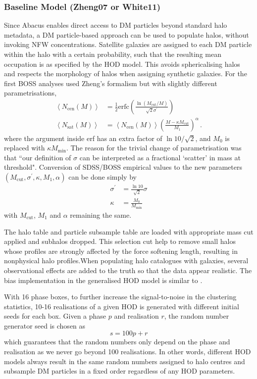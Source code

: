 \documentclass[10pt,A4]{aastex62}
\begin{document}
		\subsubsection{Baseline Model (Zheng07 or White11)}
			
			Since Abacus enables direct access to DM particles beyond standard halo metadata, a DM particle-based approach can be used to populate halos, without invoking NFW concentrations. Satellite galaxies are assigned to each DM particle within the halo with a certain probability, such that the resulting mean occupation is as specified by the HOD model. This avoids sphericalising halos and respects the morphology of halos when assigning synthetic galaxies. For the first BOSS analyses \cite{white11} used Zheng's formalism but with slightly different parametrisations,
			\begin{align}
				\left< N_\text{cen} (M) \right> &= \frac{1}{2} \mathrm{erfc} \left( \frac{\ln(M_\text{cut} / M)}{\sqrt{2} \sigma^\prime} \right) \\
				\left< N_\text{sat} (M) \right> &= \left< N_\text{cen} (M) \right> \left( \frac{M - \kappa M _\text{cut} }{M_1} \right) ^\alpha \, .
			\end{align}
			where the argument inside erf has an extra factor of $\ln 10 / \sqrt{2}$, and $M_0$ is replaced with $\kappa M_\text{min}$. The reason for the trivial change of parametrisation was that ``our definition of $\sigma$ can be interpreted as a fractional `scatter' in mass at threshold". Conversion of SDSS/BOSS empirical values to the new parameters $(M_\text{cut}, \sigma^\prime, \kappa, M_1, \alpha)$  can be done simply by
			\begin{align}
				\sigma ^\prime &= \frac{\ln 10}{\sqrt{2}} \sigma \\
				\kappa &= \frac{M_0}{M_\text{min}}
			\end{align}
			with $M_\text{cut}$, $M_1$ and $\alpha$ remaining the same.
			
			The halo table and particle subsample table are loaded with appropriate mass cut applied and subhalos dropped. This selection cut help to remove small halos whose profiles are strongly
			affected by the force softening length, resulting in nonphysical halo profiles.When populating halo catalogues with galaxies, several observational effects are added to the truth so that the data appear realistic. The bias implementation in the generalised HOD model is similar to \cite{yuan2018}.
			
			With 16 phase boxes, to further increase the signal-to-noise in the clustering statistics, 10-16 realisations of a given HOD is generated with different initial seeds for each box. Given a phase $p$ and realisation $r$, the random number generator seed is chosen as
			\begin{equation}
				s = 100p + r
			\end{equation}
			which guarantees that the random numbers only depend on the phase and realisation as we never go beyond 100 realisations. In other words, different HOD models always result in the same random numbers assigned to halo centres and subsample DM particles in a fixed order regardless of any HOD parameters. 
\end{document}
